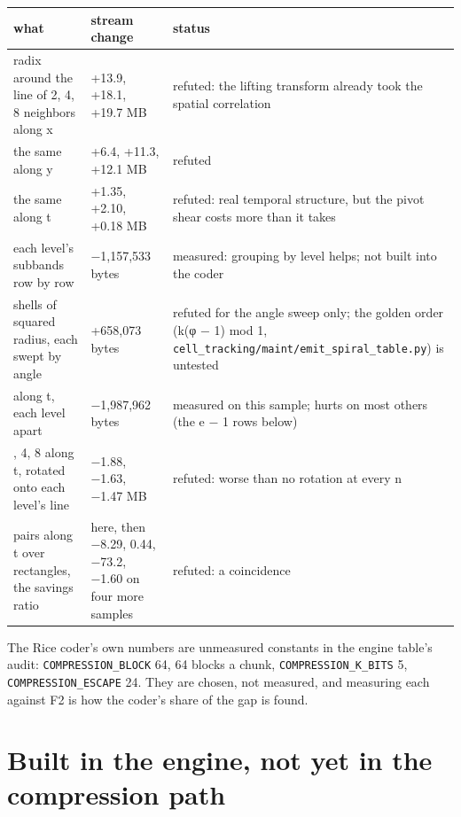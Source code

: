 {\small
\setlength{\tabcolsep}{6pt}
\begin{longtable}{>{\RaggedRight\arraybackslash}p{}>{\RaggedRight\arraybackslash}p{}>{\RaggedRight\arraybackslash}p{}}
\toprule
what & stream change & status \\
\midrule
\endhead
radix around the line of 2, 4, 8 neighbors along x & +13.9, +18.1, +19.7 MB & refuted: the lifting transform already took the spatial correlation \\
the same along y & +6.4, +11.3, +12.1 MB & refuted \\
the same along t & +1.35, +2.10, +0.18 MB & refuted: real temporal structure, but the pivot shear costs more than it takes \\
each level's subbands row by row & −1,157,533 bytes & measured: grouping by level helps; not built into the coder \\
shells of squared radius, each swept by angle & +658,073 bytes & refuted for the angle sweep only; the golden order (k(φ − 1) mod 1, \texttt{cell\_\allowbreak{}tracking/\allowbreak{}maint/\allowbreak{}emit\_\allowbreak{}spiral\_\allowbreak{}table.\allowbreak{}py}) is untested \\
2 along t, each level apart & −1,987,962 bytes & measured on this sample; hurts on most others (the e − 1 rows below) \\
2, 4, 8 along t, rotated onto each level's line & −1.88, −1.63, −1.47 MB & refuted: worse than no rotation at every n \\
pairs along t over rectangles, the savings ratio & 1.7174 here, then −8.29, 0.44, −73.2, −1.60 on four more samples & refuted: a coincidence \\
\bottomrule
\end{longtable}
}

The Rice coder's own numbers are unmeasured constants in the engine table's audit: \texttt{COMPRESSION\_\allowbreak{}BLOCK} 64, 64 blocks a chunk, \texttt{COMPRESSION\_\allowbreak{}K\_\allowbreak{}BITS} 5, \texttt{COMPRESSION\_\allowbreak{}ESCAPE} 24. They are chosen, not measured, and measuring each against F2 is how the coder's share of the gap is found.

\section{\texorpdfstring{Built in the engine, not yet in the compression path}{Built in the engine, not yet in the compression path}}

